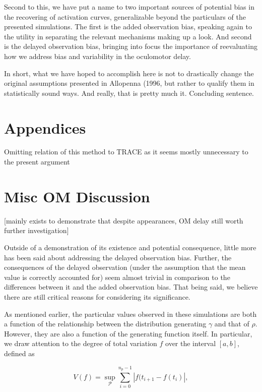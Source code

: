 Second to this, we have put a name to two important sources of potential bias in the recovering of activation curves, generalizable beyond the particulars of the presented simulations. The first is the added observation bias, speaking again to the utility in separating the relevant mechanisms making up a look. And second is the delayed observation bias, bringing into focus the importance of reevaluating how we address bias and variability in the oculomotor delay.


In short, what we have hoped to accomplish here is not to drastically change the original assumptions presented in Allopenna (1996, but rather to qualify them in statistically sound ways. And really, that is pretty much it. Concluding sentence.




\section*{Appendices}

Omitting relation of this method to TRACE as it seems mostly unnecessary to the present argument 

\section{Misc OM Discussion}

[mainly exists to demonstrate that despite appearances, OM delay still worth further investigation]

Outside of a demonstration of its existence and potential consequence, little more has been said about addressing the delayed observation bias. Further, the consequences of the delayed observation (under the assumption that the mean value is correctly accounted for) seem almost trivial in comparison to the differences between it and the added observation bias. That being said, we believe there are still critical reasons for considering its significance.

As mentioned earlier, the particular values observed in these simulations are both a function of the relationship between the distribution generating $\gamma$ and that of $\rho$. However, they are also a function of the generating function itself. In particular, we draw attention to the degree of total variation $f$ over the interval $[a,b]$, defined as 

\begin{equation}
V(f) = \underset{\mathcal{P}}{\sup} \sum_{i=0}^{n_p-1} \left|f(t_{i+1} - f(t_i) \right|,
\end{equation}

